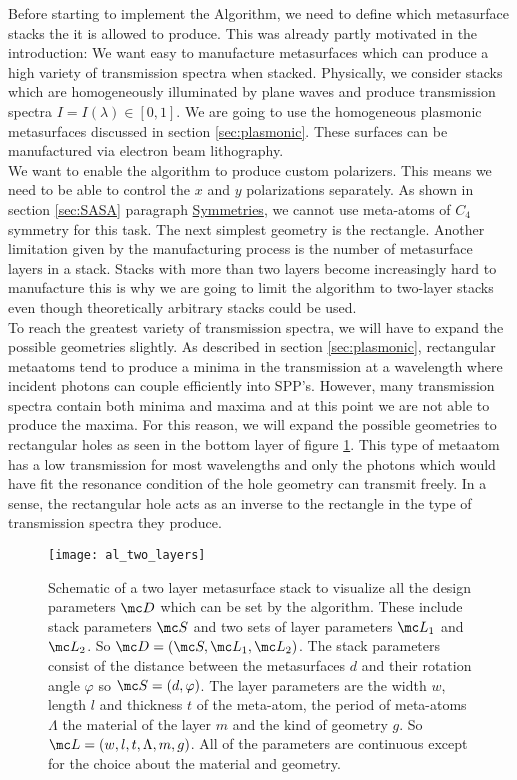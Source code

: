 Before starting to implement the Algorithm, we need to define which metasurface stacks the it is allowed to produce. This was already partly motivated in the introduction: We want easy to manufacture metasurfaces which can produce a high variety of transmission spectra when stacked.
Physically, we consider stacks which are homogeneously illuminated by plane waves and produce transmission spectra $I = I(\lambda) \in [0,1]$.
We are going to use the homogeneous plasmonic metasurfaces discussed in section \ref{sec:plasmonic}. These surfaces can be manufactured via electron beam lithography.
\\

\indent
We want to enable the algorithm to produce custom polarizers. This means we need to be able to control the $x$ and $y$ polarizations separately. 
As shown in section \ref{sec:SASA} paragraph \hyperref[sec:symmetries]{Symmetries}, we cannot use meta-atoms of $C_4$ symmetry for this task. The next simplest geometry is the rectangle. Another limitation given by the manufacturing process is the number of metasurface layers in a stack. Stacks with more than two layers become increasingly hard to manufacture this is why we are going to limit the algorithm to two-layer stacks even though theoretically arbitrary stacks could be used.
\\

\indent
To reach the greatest variety of transmission spectra, we will have to expand the possible geometries slightly. As described in section \ref{sec:plasmonic}, rectangular metaatoms tend to produce a minima in the transmission at a wavelength where incident photons can couple efficiently into SPP's. However, many transmission spectra contain both minima and maxima and at this point we are not able to produce the maxima.
For this reason, we will expand the possible geometries to rectangular holes as seen in the bottom layer of figure \ref{fig:al:two_layers}. This type of metaatom has a low transmission for most wavelengths and only the photons which would have fit the resonance condition of the hole geometry can transmit freely. In a sense, the rectangular hole acts as an inverse to the rectangle in the type of transmission spectra they produce.


\begin{figure}[H]
    \centering
    \texttt{[image: al\_two\_layers]}
    \caption{Schematic of a two layer metasurface stack to visualize all the design parameters
    $\mc D$ which can be set by the algorithm. These include stack parameters $\mc S$ and two sets of layer parameters $\mc L_1$ and $\mc L_2$.
    So ${\mc D = (\mc S, \mc L_1, \mc L_2)}$. The stack parameters consist of the distance between the metasurfaces $d$ and their rotation angle $\varphi$ so $\mc S = (d, \varphi)$. The layer parameters are the width $w$, length $l$ and thickness $t$ of the meta-atom, the period of meta-atoms $\Lambda$ the  material of the layer $m$ and the kind of geometry $g$. So $\mc L = (w,l,t,\Lambda,m,g)$. All of the parameters are continuous except for the choice about the material and geometry.}
    \label{fig:al:two_layers}
\end{figure}


